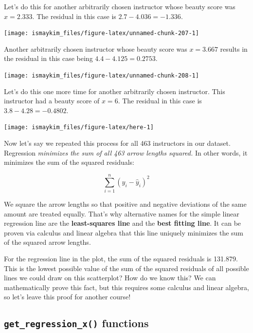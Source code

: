 \documentclass[12pt,]{krantz}
\theoremstyle{definition}
\theoremstyle{definition}
\theoremstyle{definition}
\theoremstyle{remark}
\begin{document}
Let's do this for another arbitrarily chosen instructor whose beauty
score was \(x=2.333\). The residual in this case is
\(2.7 - 4.036 = -1.336\).

\begin{center}\texttt{[image: ismaykim\_files/figure-latex/unnamed-chunk-207-1]} \end{center}

Another arbitrarily chosen instructor whose beauty score was \(x=3.667\)
results in the residual in this case being \(4.4 - 4.125 = 0.2753\).

\begin{center}\texttt{[image: ismaykim\_files/figure-latex/unnamed-chunk-208-1]} \end{center}

Let's do this one more time for another arbitrarily chosen instructor.
This instructor had a beauty score of \(x = 6\). The residual in this
case is \(3.8 - 4.28 = -0.4802\).

\begin{center}\texttt{[image: ismaykim\_files/figure-latex/here-1]} \end{center}

Now let's say we repeated this process for all 463 instructors in our
dataset. Regression \emph{minimizes the sum of all 463 arrow lengths
squared.} In other words, it minimizes the sum of the squared residuals:

\[
\sum_{i=1}^{n}(y_i - \widehat{y}_i)^2
\]

We square the arrow lengths so that positive and negative deviations of
the same amount are treated equally. That's why alternative names for
the simple linear regression line are the \textbf{least-squares line}
and the \textbf{best fitting line}. It can be proven via calculus and
linear algebra that this line uniquely minimizes the sum of the squared
arrow lengths.

For the regression line in the plot, the sum of the squared residuals is
131.879. This is the lowest possible value of the sum of the squared
residuals of all possible lines we could draw on this scatterplot? How
do we know this? We can mathematically prove this fact, but this
requires some calculus and linear algebra, so let's leave this proof for
another course!

\subsection{\texorpdfstring{\texttt{get\_regression\_x()}
functions}{get\_regression\_x() functions}}\label{underthehood}
\end{document}
